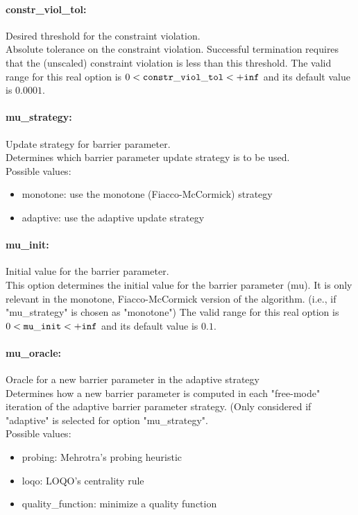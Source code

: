 \documentclass[letter,10pt]{article}
\begin{document}
\paragraph{constr\_viol\_tol:} Desired threshold for the constraint violation. $\;$ \\
 Absolute tolerance on the constraint violation.
Successful termination requires that the
(unscaled) constraint violation is less than this
threshold. The valid range for this real option is 
$0 <  {\tt constr\_viol\_tol } <  {\tt +inf}$
and its default value is $0.0001$.


\paragraph{mu\_strategy:} Update strategy for barrier parameter. $\;$ \\
 Determines which barrier parameter update
strategy is to be used.\\ 
Possible values:
\begin{itemize}
   \item monotone: use the monotone (Fiacco-McCormick) strategy
   \item adaptive: use the adaptive update strategy
\end{itemize}

\paragraph{mu\_init:} Initial value for the barrier parameter. $\;$ \\
 This option determines the initial value for the
barrier parameter (mu).  It is only relevant in
the monotone, Fiacco-McCormick version of the
algorithm. (i.e., if "mu\_strategy" is chosen as
"monotone") The valid range for this real option is 
$0 <  {\tt mu\_init } <  {\tt +inf}$
and its default value is $0.1$.


\paragraph{mu\_oracle:} Oracle for a new barrier parameter in the adaptive strategy $\;$ \\
 Determines how a new barrier parameter is
computed in each "free-mode" iteration of the
adaptive barrier parameter strategy. (Only
considered if "adaptive" is selected for option
"mu\_strategy".\\ 
Possible values:
\begin{itemize}
   \item probing: Mehrotra's probing heuristic
   \item loqo: LOQO's centrality rule
   \item quality\_function: minimize a quality function
\end{itemize}
\end{document}
